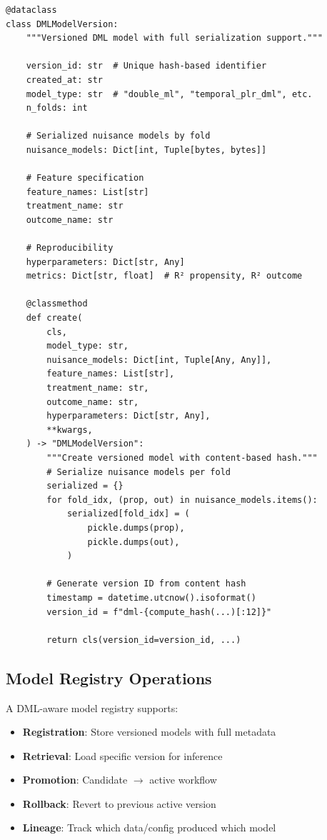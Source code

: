 \begin{verbatim}
@dataclass
class DMLModelVersion:
    """Versioned DML model with full serialization support."""

    version_id: str  # Unique hash-based identifier
    created_at: str
    model_type: str  # "double_ml", "temporal_plr_dml", etc.
    n_folds: int

    # Serialized nuisance models by fold
    nuisance_models: Dict[int, Tuple[bytes, bytes]]

    # Feature specification
    feature_names: List[str]
    treatment_name: str
    outcome_name: str

    # Reproducibility
    hyperparameters: Dict[str, Any]
    metrics: Dict[str, float]  # R² propensity, R² outcome

    @classmethod
    def create(
        cls,
        model_type: str,
        nuisance_models: Dict[int, Tuple[Any, Any]],
        feature_names: List[str],
        treatment_name: str,
        outcome_name: str,
        hyperparameters: Dict[str, Any],
        **kwargs,
    ) -> "DMLModelVersion":
        """Create versioned model with content-based hash."""
        # Serialize nuisance models per fold
        serialized = {}
        for fold_idx, (prop, out) in nuisance_models.items():
            serialized[fold_idx] = (
                pickle.dumps(prop),
                pickle.dumps(out),
            )

        # Generate version ID from content hash
        timestamp = datetime.utcnow().isoformat()
        version_id = f"dml-{compute_hash(...)[:12]}"

        return cls(version_id=version_id, ...)
\end{verbatim}

\subsection{Model Registry Operations}

A DML-aware model registry supports:

\begin{itemize}
    \item \textbf{Registration}: Store versioned models with full metadata
    \item \textbf{Retrieval}: Load specific version for inference
    \item \textbf{Promotion}: Candidate $\rightarrow$ active workflow
    \item \textbf{Rollback}: Revert to previous active version
    \item \textbf{Lineage}: Track which data/config produced which model
\end{itemize}


